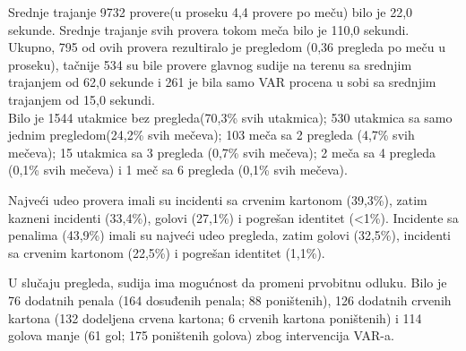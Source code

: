 \documentclass[a4paper]{article}
\begin{document}
Srednje trajanje 9732 provere(u proseku 4,4 provere po meču) bilo je 22,0 sekunde. Srednje trajanje svih provera tokom meča bilo je 110,0 sekundi. 
Ukupno, 795 od ovih provera rezultiralo je pregledom (0,36 pregleda po meču u proseku), tačnije 534 su bile provere glavnog sudije na terenu sa srednjim trajanjem od 62,0 sekunde i 261 je bila samo VAR procena u sobi sa srednjim trajanjem od 15,0 sekundi. \\

Bilo je 1544 utakmice bez pregleda(70,3\% svih utakmica); 530 utakmica sa samo jednim pregledom(24,2\% svih mečeva); 103 meča sa 2 pregleda (4,7\% svih mečeva); 15 utakmica sa 3 pregleda (0,7\% svih mečeva); 2 meča sa 4 pregleda (0,1\% svih mečeva) i 1 meč sa 6 pregleda (0,1\% svih mečeva).

Najveći udeo provera imali su incidenti sa crvenim kartonom (39,3\%), zatim kazneni incidenti (33,4\%), golovi (27,1\%) i pogrešan identitet (<1\%). Incidente sa penalima (43,9\%) imali su najveći udeo pregleda, zatim golovi (32,5\%), incidenti sa crvenim kartonom (22,5\%) i pogrešan identitet (1,1\%).

U slučaju pregleda, sudija ima mogućnost da promeni prvobitnu odluku. Bilo je 76 dodatnih penala (164 dosuđenih penala; 88 poništenih), 126 dodatnih crvenih kartona (132 dodeljena crvena kartona; 6 crvenih kartona poništenih) i 114 golova manje (61 gol; 175 poništenih golova) zbog intervencija VAR-a.
\end{document}

